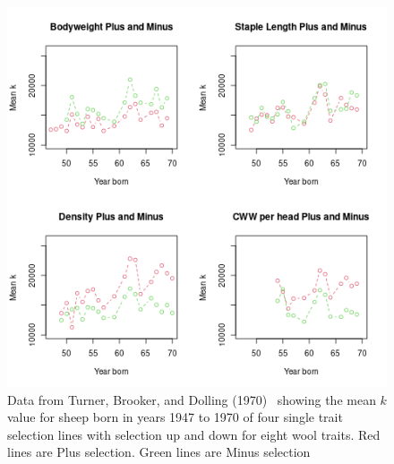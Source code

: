 %

\begin{figure}[h]
  \centering
   \includegraphics[width=1.4\textwidth,height=1.7\textwidth]{ab1fs/kfs2.png}
	\caption{Data from Turner, Brooker, and Dolling (1970)~\cite{turn:70} showing the mean $k$ value for sheep born in years 1947 to 1970  of four single trait selection lines with selection up and down for eight wool traits. Red lines are Plus selection. Green lines are Minus selection}
  \label{fig:kfs2}
\end{figure}

%

